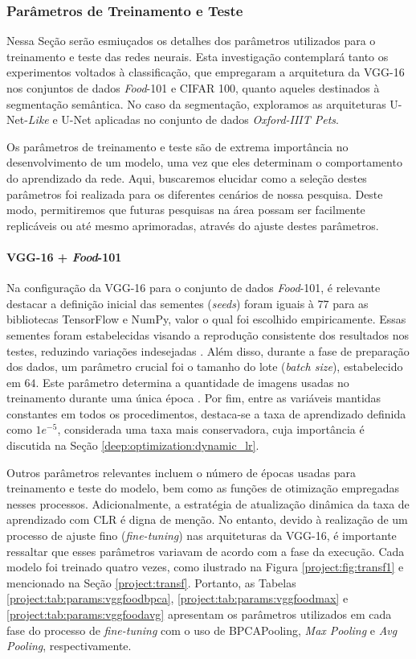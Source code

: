 \subsubsection{Parâmetros de Treinamento e Teste}
\label{project:params}
Nessa Seção serão esmiuçados os detalhes dos parâmetros utilizados para o treinamento e teste das redes neurais. Esta investigação contemplará tanto os experimentos voltados à classificação, que empregaram a arquitetura da VGG-16 nos conjuntos de dados \textit{Food}-101 e CIFAR 100, quanto aqueles destinados à segmentação semântica. No caso da segmentação, exploramos as arquiteturas U-Net-\textit{Like} e U-Net aplicadas no conjunto de dados \textit{Oxford-IIIT Pets}.

Os parâmetros de treinamento e teste são de extrema importância no desenvolvimento de um modelo, uma vez que eles determinam o comportamento do aprendizado da rede. Aqui, buscaremos elucidar como a seleção destes parâmetros foi realizada para os diferentes cenários de nossa pesquisa. Deste modo, permitiremos que futuras pesquisas na área possam ser facilmente replicáveis ou até mesmo aprimoradas, através do ajuste destes parâmetros.

\paragraph{VGG-16 + \textit{Food}-101}
\label{params:vggfood}
Na configuração da VGG-16 para o conjunto de dados \textit{Food}-101, é relevante destacar a definição inicial das sementes (\textit{seeds}) foram iguais à $77$ para as bibliotecas TensorFlow e NumPy, valor o qual foi escolhido empiricamente. Essas sementes foram estabelecidas visando a reprodução consistente dos resultados nos testes, reduzindo variações indesejadas \citep{Alahmari2020ChallengesModels}. Além disso, durante a fase de preparação dos dados, um parâmetro crucial foi o tamanho do lote (\textit{batch size}), estabelecido em $64$. Este parâmetro determina a quantidade de imagens usadas no treinamento durante uma única época \citep{Kandel2020TheDataset}. Por fim, entre as variáveis mantidas constantes em todos os procedimentos, destaca-se a taxa de aprendizado definida como $1e^{-5}$, considerada uma taxa mais conservadora, cuja importância é discutida na Seção \ref{deep:optimization:dynamic_lr}.

Outros parâmetros relevantes incluem o número de épocas usadas para treinamento e teste do modelo, bem como as funções de otimização empregadas nesses processos. Adicionalmente, a estratégia de atualização dinâmica da taxa de aprendizado com CLR \citep{Smith2017CyclicalNetworks} é digna de menção. No entanto, devido à realização de um processo de ajuste fino (\textit{fine-tuning}) nas arquiteturas da VGG-16, é importante ressaltar que esses parâmetros variavam de acordo com a fase da execução. Cada modelo foi treinado quatro vezes, como ilustrado na Figura \ref{project:fig:transf1} e mencionado na Seção \ref{project:transf}. Portanto, as Tabelas \ref{project:tab:params:vggfoodbpca}, \ref{project:tab:params:vggfoodmax} e \ref{project:tab:params:vggfoodavg} apresentam os parâmetros utilizados em cada fase do processo de \textit{fine-tuning} com o uso de BPCAPooling, \textit{Max Pooling} e \textit{Avg Pooling}, respectivamente.

